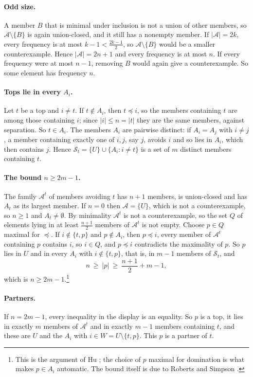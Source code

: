 \documentclass[aps,prd,twocolumn,superscriptaddress,nofootinbib,longbibliography,floatfix,amsmath,amssymb,10pt]{revtex4-2}
\theoremstyle{plain}
\theoremstyle{definition}
\theoremstyle{plain}
\newcommand{\cA}{\mathcal{A}}
\begin{document}
\paragraph*{Odd size.} A member $B$ that is minimal under inclusion is not a union of other members, so $\cA\setminus\{B\}$ is again union-closed, and it still has a nonempty member. If $|\cA|=2k$, every frequency is at most $k-1<\frac{2k-1}{2}$, so $\cA\setminus\{B\}$ would be a smaller counterexample. Hence $|\cA|=2n+1$ and every frequency is at most $n$. If every frequency were at most $n-1$, removing $B$ would again give a counterexample. So some element has frequency $n$.

\paragraph*{Tops lie in every $A_i$.} Let $t$ be a top and $i\neq t$. If $t\notin A_i$, then $t\preceq i$, so the members containing $t$ are among those containing $i$; since $|i|\le n=|t|$ they are the same members, against separation. So $t\in A_i$. The members $A_i$ are pairwise distinct: if $A_i=A_j$ with $i\ne j$, a member containing exactly one of $i,j$, say $j$, avoids $i$ and so lies in $A_i$, which then contains $j$. Hence $\mathcal S_t=\{U\}\cup\{A_i:i\ne t\}$ is a set of $m$ distinct members containing $t$.

\paragraph*{The bound $n\ge2m-1$.} The family $\cA^t$ of members avoiding $t$ has $n+1$ members, is union-closed and has $A_t$ as its largest member. If $n=0$ then $\cA=\{U\}$, which is not a counterexample, so $n\ge1$ and $A_t\ne\emptyset$. By minimality $\cA^t$ is not a counterexample, so the set $Q$ of elements lying in at least $\frac{n+1}{2}$ members of $\cA^t$ is not empty. Choose $p\in Q$ maximal for $\preceq$. If $i\notin\{t,p\}$ and $p\notin A_i$, then $p\preceq i$, every member of $\cA^t$ containing $p$ contains $i$, so $i\in Q$, and $p\preceq i$ contradicts the maximality of $p$. So $p$ lies in $U$ and in every $A_i$ with $i\notin\{t,p\}$, that is, in $m-1$ members of $\mathcal S_t$, and
\[
n\ \ge\ |p|\ \ge\ \frac{n+1}{2}+m-1,
\]
which is $n\ge 2m-1$.\footnote{This is the argument of Hu \cite{Hu17}; the choice of $p$ maximal for domination is what makes $p\in A_i$ automatic. The bound itself is due to Roberts and Simpson \cite{RS10}.}

\paragraph*{Partners.} If $n=2m-1$, every inequality in the display is an equality. So $p$ is a top, it lies in exactly $m$ members of $\cA^t$ and in exactly $m-1$ members containing $t$, and these are $U$ and the $A_i$ with $i\in W=U\setminus\{t,p\}$. This $p$ is a partner of $t$.
\end{document}
